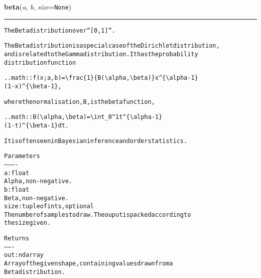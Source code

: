    \label{QSTK:qstklearn:mldiagnostics:beta}

    \vspace{0.5ex}

\hspace{.8\funcindent}\begin{boxedminipage}{\funcwidth}

    \raggedright \textbf{beta}(\textit{a}, \textit{b}, \textit{size}={\tt None})

    \vspace{-1.5ex}

    \rule{\textwidth}{0.5\fboxrule}
\setlength{\parskip}{2ex}
\begin{alltt}
The Beta distribution over ``[0, 1]``.

The Beta distribution is a special case of the Dirichlet distribution,
and is related to the Gamma distribution.  It has the probability
distribution function

.. math:: f(x; a,b) = {\textbackslash}frac\{1\}\{B({\textbackslash}alpha, {\textbackslash}beta)\} x{\textasciicircum}\{{\textbackslash}alpha - 1\}
                                                 (1 - x){\textasciicircum}\{{\textbackslash}beta - 1\},

where the normalisation, B, is the beta function,

.. math:: B({\textbackslash}alpha, {\textbackslash}beta) = {\textbackslash}int\_0{\textasciicircum}1 t{\textasciicircum}\{{\textbackslash}alpha - 1\}
                             (1 - t){\textasciicircum}\{{\textbackslash}beta - 1\} dt.

It is often seen in Bayesian inference and order statistics.

Parameters
----------
a : float
    Alpha, non-negative.
b : float
    Beta, non-negative.
size : tuple of ints, optional
    The number of samples to draw.  The ouput is packed according to
    the size given.

Returns
-------
out : ndarray
    Array of the given shape, containing values drawn from a
    Beta distribution.
\end{alltt}

\setlength{\parskip}{1ex}
    \end{boxedminipage}

    \label{QSTK:qstklearn:mldiagnostics:binomial}

